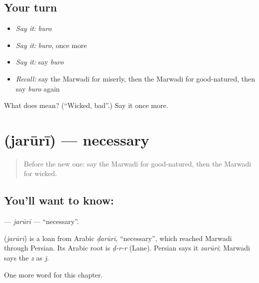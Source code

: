 \subsection*{Your turn}
\begin{itemize}
\raggedright
  \item \emph{Say it:} \emph{buro}
  \item \emph{Say it:} \emph{buro}, once more
  \item \emph{Say it:} say \emph{buro}
  \item \emph{Recall:} say the Marwadi for miserly, then the Marwadi for good-natured, then say \emph{buro} again
\end{itemize}

\begin{tcolorbox}[breakable,colback=teal!4,colframe=teal!35!black,title={Before you move on}]
What does  mean? (\textquotedblleft{}Wicked, bad\textquotedblright{}.) Say it once more.
\end{tcolorbox}
\section[\texorpdfstring{\mw{जरूरी} (jarūrī)}{जरूरी (jarūrī)}]{ (jarūrī) — necessary}

\label{lesson:MW-C148-jaruri}



\begin{quote}
Before the new one: say the Marwadi for good-natured, then the Marwadi for wicked.
\end{quote}

\subsection*{You'll want to know: }
\textbf{} — \emph{jarūrī} — \textquotedblleft{}necessary\textquotedblright{}.

\begin{cousinweb}
\textbf{} (\emph{jarūrī}) is a loan from Arabic \emph{ḍarūrī}, \textquotedblleft{}necessary\textquotedblright{}, which reached Marwadi through Persian. Its Arabic root is \emph{ḍ-r-r} (Lane). Persian says it \emph{zarūrī}; Marwadi says the \emph{z} as \emph{j}.
\end{cousinweb}

\begin{grammarlens}[title={What you've built}]
One more word for this chapter.
\end{grammarlens}

